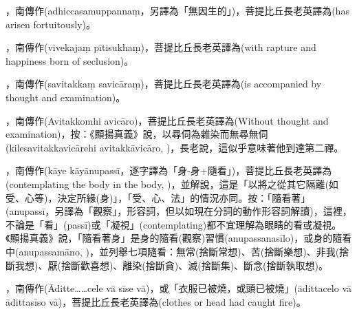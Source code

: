 \startitemgroup[noteitems]
\item{}，南傳作(adhiccasamuppannaṃ，另譯為「無因生的」)，菩提比丘長老英譯為(has arisen fortuitously)。
\stopitemgroup

\startitemgroup[noteitems]
\item{}，南傳作(vivekajaṃ pītisukhaṃ)，菩提比丘長老英譯為(with rapture and happiness born of seclusion)。
\stopitemgroup

\startitemgroup[noteitems]
\item{}，南傳作(savitakkaṃ savicāraṃ)，菩提比丘長老英譯為(is accompanied by thought and examination)。
\item{}，南傳作(Avitakkomhi avicāro)，菩提比丘長老英譯為(Without thought and examination)，按：《顯揚真義》說，以尋伺為雜染而無尋無伺(kilesavitakkavicārehi avitakkāvicāro, )，長老說，這似乎意味著他到達第二禪。
\stopitemgroup

\startitemgroup[noteitems]
\item{}，南傳作(kāye kāyānupassī，逐字譯為「身-身+隨看」)，菩提比丘長老英譯為(contemplating the body in the body, )，並解說，這是「以將之從其它隔離(如受、心等)，決定所緣(身)」，「受、心、法」的情況亦同。按：「隨看著」(anupassī，另譯為「觀察」，形容詞，但以如現在分詞的動作形容詞解讀)，這裡，不論是「看」(passī)或「凝視」(contemplating)都不宜理解為眼睛的看或凝視。《顯揚真義》說，「隨看著身」是身的隨看(觀察)習慣(anupassanasīlo)，或身的隨看中(anupassamāno, )，並列舉七項隨看：無常(捨斷常想)、苦(捨斷樂想)、非我(捨斷我想)、厭(捨斷歡喜想)、離染(捨斷貪)、滅(捨斷集)、斷念(捨斷執取想)。
\stopitemgroup

\startitemgroup[noteitems]
\item{}，南傳作(Āditte……cele vā sīse vā)，或「衣服已被燒，或頭已被燒」(ādittacelo vā ādittasīso vā)，菩提比丘長老英譯為(clothes or head had caught fire)。
\stopitemgroup


